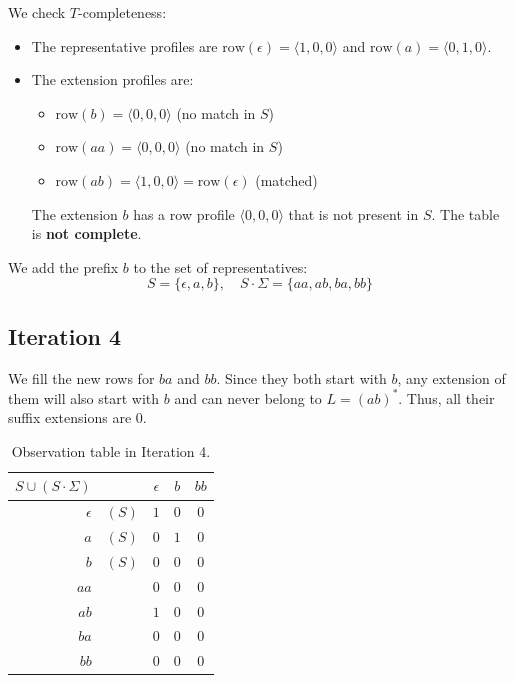 We check $T$-completeness:
\begin{itemize}
  \item The representative profiles are $\text{row}(\epsilon) = \langle 1, 0, 0 \rangle$ and $\text{row}(a) = \langle 0, 1, 0 \rangle$.
  \item The extension profiles are:
  \begin{itemize}
    \item $\text{row}(b) = \langle 0, 0, 0 \rangle$ (no match in $S$)
    \item $\text{row}(aa) = \langle 0, 0, 0 \rangle$ (no match in $S$)
    \item $\text{row}(ab) = \langle 1, 0, 0 \rangle = \text{row}(\epsilon)$ (matched)
  \end{itemize}
  The extension $b$ has a row profile $\langle 0, 0, 0 \rangle$ that is not present in $S$. The table is \textbf{not complete}.
\end{itemize}
We add the prefix $b$ to the set of representatives:
\[
  S = \{\epsilon, a, b\}, \quad S \cdot \Sigma = \{aa, ab, ba, bb\}
\]

\subsection{Iteration 4}

We fill the new rows for $ba$ and $bb$. Since they both start with $b$, any extension of them will also start with $b$ and can never belong to $L = (ab)^*$. Thus, all their suffix extensions are $0$.

\begin{table}[H]
  \centering
  \begin{tabular}{rcccc}
    \toprule
    $S \cup (S \cdot \Sigma)$ & & $\epsilon$ & $b$ & $bb$ \\
    \midrule
    $\epsilon$ & $(S)$ & $1$ & $0$ & $0$ \\
    $a$ & $(S)$ & $0$ & $1$ & $0$ \\
    $b$ & $(S)$ & $0$ & $0$ & $0$ \\
    \midrule
    $aa$ & & $0$ & $0$ & $0$ \\
    $ab$ & & $1$ & $0$ & $0$ \\
    $ba$ & & $0$ & $0$ & $0$ \\
    $bb$ & & $0$ & $0$ & $0$ \\
    \bottomrule
  \end{tabular}
  \caption{Observation table in Iteration 4.}
  \label{tab:iter4}
\end{table}

